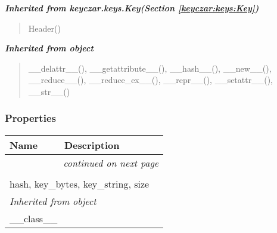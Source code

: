 \large{\textbf{\textit{Inherited from keyczar.keys.Key\textit{(Section \ref{keyczar:keys:Key})}}}}

\begin{quote}
Header()
\end{quote}

\large{\textbf{\textit{Inherited from object}}}

\begin{quote}
\_\_delattr\_\_(), \_\_getattribute\_\_(), \_\_hash\_\_(), \_\_new\_\_(), \_\_reduce\_\_(), \_\_reduce\_ex\_\_(), \_\_repr\_\_(), \_\_setattr\_\_(), \_\_str\_\_()
\end{quote}


  \subsubsection{Properties}

    \vspace{-1cm}
\hspace{\varindent}\begin{longtable}{|p{\varnamewidth}|p{\vardescrwidth}|l}
\cline{1-2}
\cline{1-2} \centering \textbf{Name} & \centering \textbf{Description}& \\
\cline{1-2}
\endhead\cline{1-2}\multicolumn{3}{r}{\small\textit{continued on next page}}\\\endfoot\cline{1-2}
\endlastfoot\multicolumn{2}{|l|}{\textit{Inherited from keyczar.keys.Key \textit{(Section \ref{keyczar:keys:Key})}}}\\
\multicolumn{2}{|p{\varwidth}|}{\raggedright hash, key\_bytes, key\_string, size}\\
\cline{1-2}
\multicolumn{2}{|l|}{\textit{Inherited from object}}\\
\multicolumn{2}{|p{\varwidth}|}{\raggedright \_\_class\_\_}\\
\cline{1-2}
\end{longtable}



